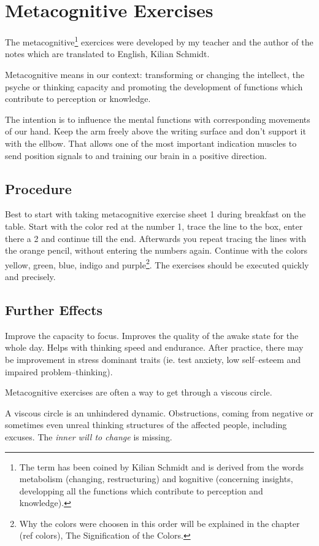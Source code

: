 \documentclass[../main.tex]{subfiles}
\begin{document}
  \chapter{Metacognitive Exercises}\label{metacognitive}
  The metacognitive\footnote{The term has been coined by Kilian Schmidt and is derived from the words metabolism (changing, restructuring) and kognitive (concerning insights, developping all the functions which contribute to perception and knowledge).} exercices were developed by my teacher and the author of the notes which are translated to English, Kilian Schmidt.


Metacognitive means in our context: {transforming} or changing the {intellect}, the
psyche or {thinking capacity}  and promoting the development of
functions which contribute to perception or knowledge.

The intention is to {influence the mental functions} with corresponding {movements of our hand}.
Keep the arm freely above the writing surface and don't support it with the ellbow. {That allows one of the most important indication muscles to  send position signals to and training our brain in a positive direction.}

\section{Procedure}

Best to start with taking metacognitive exercise sheet 1 during breakfast on the table. Start with the color red at the number 1, trace the line to the box, enter there a 2 and continue till the end. Afterwards you repeat tracing the lines with the orange pencil, without entering the numbers again. Continue with the colors yellow, green, blue, indigo and purple\footnote{Why the colors were choosen in this order will be explained in the chapter (ref colors), The Signification of the Colors.}. The exercises should be executed quickly and precisely.

\section{Further Effects}

Improve the capacity to {focus}.
Improves the quality of the {awake state} for the whole day.
Helps with {thinking speed and endurance}.
After practice, there may be improvement in {stress dominant traits} (ie. test anxiety, low self--esteem and impaired problem--thinking).
{Metacognitive exercises are often a way to get through a {viscous circle}. 

A viscous circle is an unhindered dynamic. {Obstructions}, coming from negative or sometimes even unreal thinking structures of the affected people, including excuses. The \emph{inner will to change} is missing.}
\end{document}
